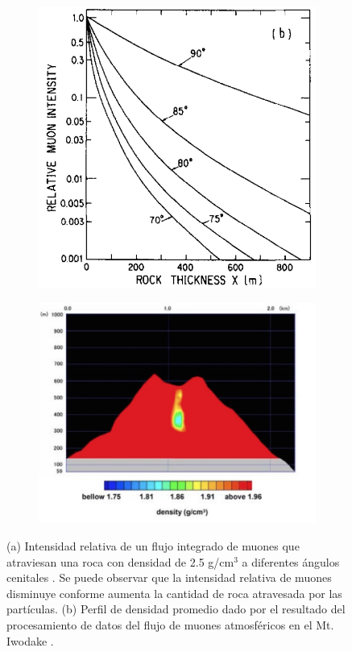 \documentclass[12pt,oneside,openany,letter]{book}
\begin{document}
\begin{figure}[h]
\begin{subfigure}{0.4\textwidth}
\includegraphics[width=\textwidth]{muon_intesity.png}
\caption{}
\label{muon_intensity}
\end{subfigure}
\begin{subfigure}{0.6\textwidth}
\includegraphics[width=\textwidth]{images/perfil.jpg}
\caption{}
\label{perfil}
\end{subfigure}
 \caption[Intensidad de muones que penetran una roca con densidad conocida]{(a) Intensidad relativa de un flujo integrado de muones que atraviesan una roca con densidad de 2.5 g/cm$^3$ a diferentes ángulos cenitales \cite{Nagamine-etal1995}. Se puede observar que la intensidad relativa de muones disminuye conforme aumenta la cantidad de roca atravesada por las partículas. (b) Perfil de densidad promedio dado por el resultado del procesamiento de datos del flujo de muones atmosféricos en el Mt. Iwodake \cite{Tanaka-etal2009}.}
  \label{figura1}
\end{figure}
\end{document}

